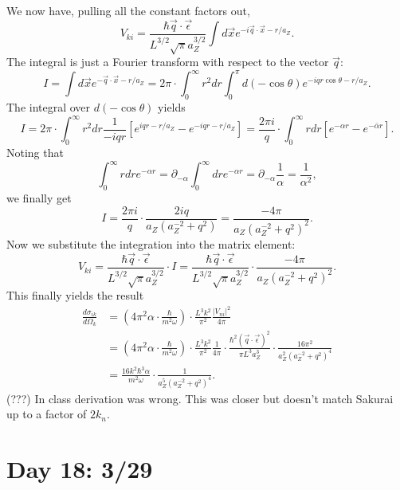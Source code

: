 \documentclass[fontsize=12pt]{scrartcl}
\newcommand{\ptl}{\partial}
\begin{document}
We now have, pulling all the constant factors out, $$V_{ki} = \frac{\hbar\vec{q}\cdot\vec{\epsilon}}{L^{3/2}\sqrt{\pi}a_Z^{3/2}}\int d\vec{x}e^{-i\vec{q}\cdot\vec{x}-r/a_Z}.$$ The integral is just a Fourier transform with respect to the vector $\vec{q}$: $$I=\int d\vec{x}e^{-\vec{q}\cdot\vec{x}-r/a_Z} = 2\pi\cdot\int_0^\infty r^2dr \int_0^\pi d(-\cos\theta)e^{-iqr\cos\theta - r/a_Z}.$$ The integral over $d(-\cos\theta)$ yields $$I=2\pi\cdot\int_0^\infty r^2dr\frac{1}{-iqr}\left[e^{iqr-r/a_Z}-e^{-iqr-r/a_Z}\right]=\frac{2\pi i}{q}\cdot\int_0^\infty r dr \left[e^{-\alpha r}-e^{-\bar{\alpha}r}\right].$$ Noting that $$\int_0^\infty rdr e^{-\alpha r} = \ptl_{-\alpha}\int_0^\infty  dr e^{-\alpha r} = \ptl_{-\alpha}\frac{1}{\alpha}=\frac{1}{\alpha^2},$$ we finally get $$I=\frac{2\pi i}{q}\cdot\frac{2iq}{a_Z(a_Z^{-2}+q^2)} = \frac{-4\pi}{a_Z(a_Z^{-2}+q^2)^2}.$$ Now we substitute the integration into the matrix element: $$V_{ki}= \frac{\hbar\vec{q}\cdot\vec{\epsilon}}{L^{3/2}\sqrt{\pi}a_Z^{3/2}}\cdot I = \frac{\hbar\vec{q}\cdot\vec{\epsilon}}{L^{3/2}\sqrt{\pi}a_Z^{3/2}} \cdot \frac{-4\pi}{a_Z(a_Z^{-2}+q^2)^2}.$$ This finally yields the result \begin{align*} \frac{d\sigma_{ik}}{d\Omega_k} &=\left(4\pi^2\alpha\cdot\frac{\hbar}{m^2\omega}\right)\cdot\frac{L^3k^2}{\pi^2}\frac{|V_{ni}|^2}{4\pi}\\
&= \left(4\pi^2\alpha\cdot\frac{\hbar}{m^2\omega}\right)\cdot\frac{L^3k^2}{\pi^2}\frac{1}{4\pi}\cdot\frac{\hbar^2(\vec{q}\cdot\vec{\epsilon})^2}{\pi L^3 a_Z^3}\cdot\frac{16\pi^2}{a_Z^2(a_Z^{-2}+q^2)^4}\\
&= \frac{16 k^2\hbar^3 \alpha}{m^2\omega}\cdot\frac{1}{a_Z^5(a_Z^{-2}+q^2)^4}.\end{align*} (???) In class derivation was wrong. This was closer but doesn't match Sakurai up to a factor of $2k_n$.


\section{Day 18: 3/29}
\end{document}
